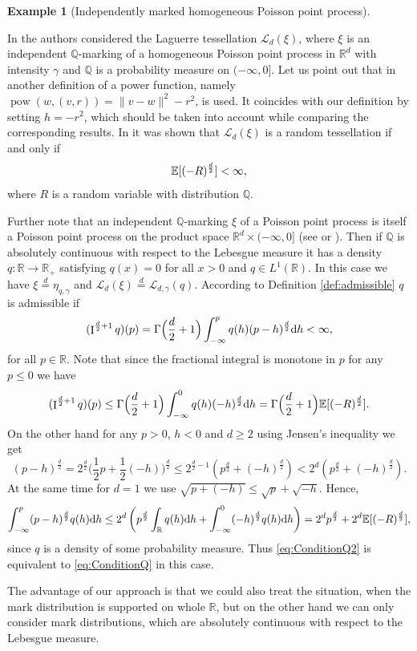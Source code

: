 \documentclass[11pt,a4paper]{article}
\theoremstyle{plain}
\theoremstyle{definition}
\newtheorem{example}[theorem]{Example}
\theoremstyle{remark}
\def\EE{\mathbb{E}}
\def\QQ{\mathbb{Q}}
\def\RR{\mathbb{R}}
\def\cL{\mathcal{L}}
\newcommand{\frI}{\mathop{\mathrm{I}}\nolimits}
\newcommand{\pow}{\mathop{\mathrm{pow}}\nolimits}
\newcommand{\dint}{\textup{d}}
\begin{document}
\begin{example}[Independently marked homogeneous Poisson point process]\label{ex:IndQMarking}

In \cite{LZ08,Ldoc} the authors considered the Laguerre tessellation $\cL_d(\xi)$, where $\xi$ is an independent $\QQ$-marking of a homogeneous Poisson point process in $\RR^d$ with intensity $\gamma$ and $\QQ$ is a probability measure on $(-\infty,0]$. Let us point out that in \cite{LZ08,Ldoc} another definition of a power function, namely $\pow(w,(v,r))=\|v-w\|^2-r^2$, is used. It coincides with our definition by setting $h=-r^2$, which should be taken into account while comparing the corresponding results. In \cite[Theorem 4.1]{LZ08} it was shown that $\cL_d(\xi)$ is a random tessellation if and only if
\begin{equation}\label{eq:ConditionQ}
    \EE[(-R)^{d\over 2}]<\infty,
\end{equation}
where $R$ is a random variable with distribution $\QQ$.

Further note that an independent $\QQ$-marking $\xi$ of a Poisson point process is itself a Poisson point process on the product space $\RR^d\times (-\infty,0]$ (see \cite[Theorem 3.5.7]{SW} or \cite[Proposition 6.16]{LP}). Then if $\QQ$ is absolutely continuous with respect to the Lebesgue measure it has a density $q:\RR\to\RR_+$ satisfying $q(x)=0$ for all $x>0$ and $q\in L^1(\RR)$. In this case we have $\xi\overset{d}{=}\eta_{q,\gamma}$ and $\cL_d(\xi)\overset {d}{=}\cL_{d,\gamma}(q)$. According to Definition \ref{def:admissible} $q$ is admissible if 
\begin{equation}\label{eq:ConditionQ2}
    (\frI^{{d\over 2}+1}q)(p)=\Gamma\Big({d\over 2}+1\Big)\int_{-\infty}^pq(h)(p-h)^{d\over 2}\dint h<\infty,
\end{equation}
for all $p\in \RR$. Note that since the fractional integral is monotone in $p$ for any $p\leq 0$ we have
\[
(\frI^{{d\over 2}+1}q)(p)\leq \Gamma\Big({d\over 2}+1\Big)\int_{-\infty}^0q(h)(-h)^{d\over 2}\dint h=\Gamma\Big({d\over 2}+1\Big)\EE[(-R)^{d\over 2}].
\]
On the other hand for any $p>0$, $h<0$ and $d\ge 2$ using Jensen's inequality we get 
\[
    (p-h)^{\frac{d}{2}}=2^{\frac{d}{2}}\Big(\frac{1}{2}p+\frac{1}{2}(-h)\Big)^{\frac{d}{2}}\le 2^{\frac{d}{2}-1}(p^{\frac{d}{2}}+(-h)^{\frac{d}{2}})<2^{d}(p^{\frac{d}{2}}+(-h)^{\frac{d}{2}}).
\]
At the same time for $d=1$ we use $\sqrt{p+(-h)}\leq \sqrt{p}+\sqrt{-h}$. Hence,
\[
    \int_{-\infty}^p(p-h)^{d\over 2}q(h)\dint h\leq 2^{d} \left(p^{d\over 2}\int_{\RR}q(h)\dint h+\int_{-\infty}^0(-h)^{\frac{d}{2}}q(h)\dint h\right)=2^{d}p^{d\over 2}+2^{d}\EE[(-R)^{d\over 2}],
\]
since $q$ is a density of some probability measure. Thus \eqref{eq:ConditionQ2} is equivalent to \eqref{eq:ConditionQ} in this case.

The advantage of our approach is that we could also treat the situation, when the mark distribution is supported on whole $\RR$, but on the other hand we can only consider mark distributions, which are absolutely continuous with respect to the Lebesgue measure.
\end{example}
\end{document}

